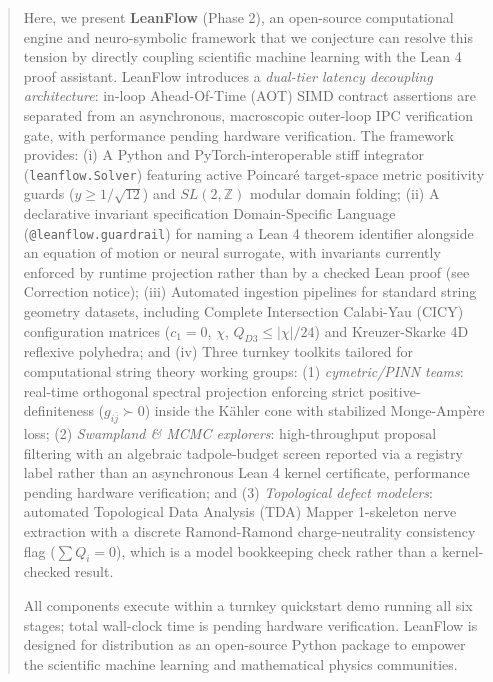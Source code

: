 \documentclass[11pt,a4paper]{article}
\begin{document}
\begin{abstract}
Here, we present \textbf{LeanFlow} (Phase 2), an open-source computational engine and neuro-symbolic framework that we conjecture can resolve this tension by directly coupling scientific machine learning with the Lean 4 proof assistant. LeanFlow introduces a \emph{dual-tier latency decoupling architecture}: in-loop Ahead-Of-Time (AOT) SIMD contract assertions are separated from an asynchronous, macroscopic outer-loop IPC verification gate, with performance pending hardware verification. The framework provides:
(i) A Python and PyTorch-interoperable stiff integrator (\texttt{leanflow.Solver}) featuring active Poincaré target-space metric positivity guards ($y \ge 1/\sqrt{12}$) and $SL(2, \mathbb{Z})$ modular domain folding;
(ii) A declarative invariant specification Domain-Specific Language (\texttt{@leanflow.guardrail}) for naming a Lean 4 theorem identifier alongside an equation of motion or neural surrogate, with invariants currently enforced by runtime projection rather than by a checked Lean proof (see Correction notice);
(iii) Automated ingestion pipelines for standard string geometry datasets, including Complete Intersection Calabi-Yau (CICY) configuration matrices ($c_1=0$, $\chi$, $Q_{D3} \le |\chi|/24$) and Kreuzer-Skarke 4D reflexive polyhedra; and
(iv) Three turnkey toolkits tailored for computational string theory working groups:
(1) \emph{cymetric/PINN teams}: real-time orthogonal spectral projection enforcing strict positive-definiteness ($g_{i\bar{j}} \succ 0$) inside the Kähler cone with stabilized Monge-Ampère loss;
(2) \emph{Swampland \& MCMC explorers}: high-throughput proposal filtering with an algebraic tadpole-budget screen reported via a registry label rather than an asynchronous Lean 4 kernel certificate, performance pending hardware verification; and
(3) \emph{Topological defect modelers}: automated Topological Data Analysis (TDA) Mapper 1-skeleton nerve extraction with a discrete Ramond-Ramond charge-neutrality consistency flag ($\sum Q_i = 0$), which is a model bookkeeping check rather than a kernel-checked result.

All components execute within a turnkey quickstart demo running all six stages; total wall-clock time is pending hardware verification. LeanFlow is designed for distribution as an open-source Python package to empower the scientific machine learning and mathematical physics communities.
\end{abstract}
\end{document}

